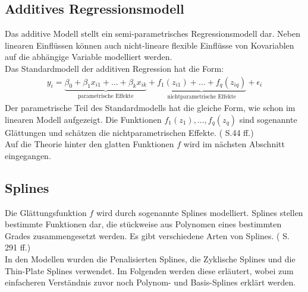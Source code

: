 \documentclass[12pt]{scrreprt}
\begin{document}
\subsection{Additives Regressionsmodell}
Das additive Modell stellt ein semi-parametrisches Regressionsmodell dar. Neben linearen Einflüssen können auch nicht-lineare flexible Einﬂüsse von Kovariablen auf die abhängige Variable modelliert werden. \\
Das Standardmodell der additiven Regression hat die Form:
\begin{align}
y_{i}=\underbrace{\beta_{0}+\beta_{1}x_{i1}+...+\beta_{k}x_{ik}}_{\text{parametrische Effekte}}+ \underbrace{f_{1}(z_{i1})+...+f_{q}(z_{iq})}_{\text{nichtparametrische Effekte}}+\epsilon_{i}
\end{align}
Der parametrische Teil des Standardmodells hat die gleiche Form, wie schon im linearen Modell aufgezeigt. Die Funktionen $f_{1}(z_{1}),...,f_{q}(z_{q})$ sind sogenannte Glättungen und schätzen die nichtparametrischen Effekte. (\cite{fahrmeir2007regression} S.44 ff.) \\
Auf die Theorie hinter den glatten Funktionen $f$ wird im nächsten Abschnitt eingegangen.

\subsection{Splines}
Die Glättungsfunktion $f$ wird durch sogenannte Splines modelliert. Splines stellen bestimmte Funktionen dar, die stückweise aus Polynomen eines bestimmten Grades zusammengesetzt werden. Es gibt verschiedene Arten von Splines. (\cite{fahrmeir2007regression} S. 291 ff.) \\
In den Modellen wurden die Penalisierten Splines, die Zyklische Splines und die Thin-Plate Splines verwendet. Im Folgenden werden diese erläutert, wobei zum einfacheren Verständnis zuvor noch Polynom- und Basis-Splines erklärt werden.
\end{document}
